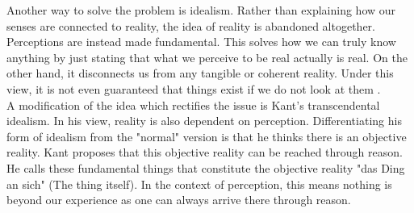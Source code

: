 \documentclass[fleqn,14pt]{article}
\begin{document}
Another way to solve the problem is idealism. Rather than explaining how our senses are connected
to reality, the idea of reality is abandoned altogether. Perceptions are instead made fundamental.
This solves how we can truly know anything by just stating that what we perceive
to be real actually is real. On the other hand, it disconnects us from any tangible or coherent reality.
Under this view, it is not even guaranteed that things exist if we do not look at
them \cite[p.73ff]{pritchard}.\\
A modification of the idea which rectifies the issue is Kant's transcendental idealism.
In his view, reality is also dependent on perception. Differentiating his form of idealism from the "normal"
version is that he thinks there is an objective reality\cite{otfried}. Kant proposes that this objective
reality can be reached through reason. He calls these fundamental things that constitute the objective
reality "das Ding an sich" (The thing itself). In the context of perception, this means nothing is beyond our
experience as one can always arrive there through reason. \\
\\
\end{document}
